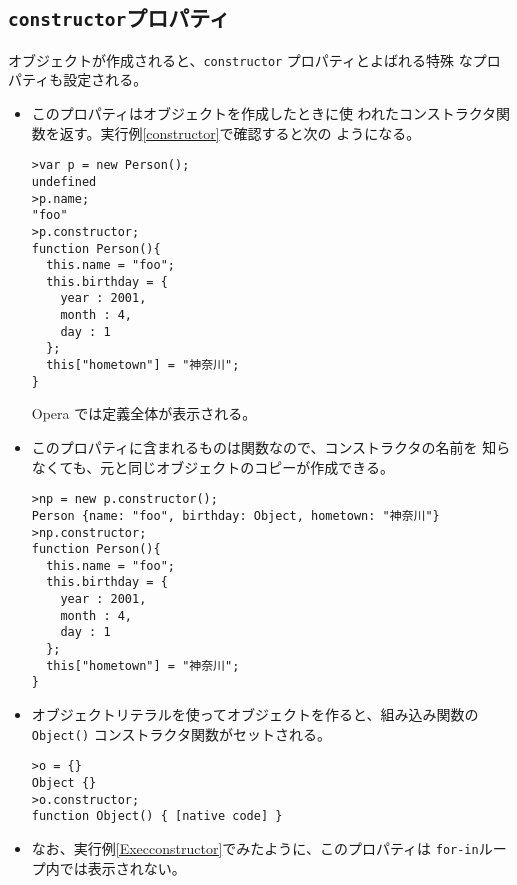 \subsection{\protect\texttt{constructor}プロパティ}\label{constructorProp}
オブジェクトが作成されると、\verb+constructor+ プロパティとよばれる特殊
なプロパティも設定される。
\begin{itemize}
 \item このプロパティはオブジェクトを作成したときに使
われたコンストラクタ関数を返す。実行例\ref{constructor}で確認すると次の
       ようになる。
\begin{Verbatim}
>var p = new Person();
undefined
>p.name;
"foo"
>p.constructor;
function Person(){
  this.name = "foo";
  this.birthday = {
    year : 2001,
    month : 4,
    day : 1
  };
  this["hometown"] = "神奈川";
}
\end{Verbatim}
Opera では定義全体が表示される。
 \item このプロパティに含まれるものは関数なので、コンストラクタの名前を
       知らなくても、元と同じオブジェクトのコピーが作成できる。
\begin{Verbatim}
>np = new p.constructor();
Person {name: "foo", birthday: Object, hometown: "神奈川"}
>np.constructor;
function Person(){
  this.name = "foo";
  this.birthday = {
    year : 2001,
    month : 4,
    day : 1
  };
  this["hometown"] = "神奈川";
}
\end{Verbatim}
 \item オブジェクトリテラルを使ってオブジェクトを作ると、組み込み関数の
       \verb+Object()+ コンストラクタ関数がセットされる。
\begin{Verbatim}
>o = {}
Object {}
>o.constructor;
function Object() { [native code] }
\end{Verbatim}
 \item なお、実行例\ref{Execconstructor}でみたように、このプロパティは
       \verb+for-in+ループ内では表示されない。
\end{itemize}
\fi
\iffalse
\section{\protect\texttt{Function}オブジェクト}
\paragraph{\protect\texttt{Function}オブジェクトのプロパティ}
関数は \texttt{function} を用いるほかに \texttt{Function()} コンストラク
タ関数を用いても作成できます。ほとんどメリットがないので、ここでは省略す
る。代表的なプロパティとして、コンストラクタ関数を表す
\texttt{constructor} と定義された関数の仮引数の個数を示す
\texttt{length} がある。
\begin{Verbatim}
>Person.constructor;
function Function() { [native code] }
>Person.length
0
\end{Verbatim}
このほかに重要な\texttt{prototype} プロパティがある。これについては次回
の授業で解説をする。
\fi
\iffalse
